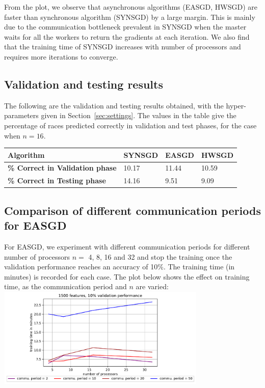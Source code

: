 \documentclass[12pt]{article}
\begin{document}
From the plot, we observe that asynchronous algorithms (EASGD, HWSGD) are faster than synchronous algorithm (SYNSGD) by a large margin. This is mainly due to the communication bottleneck prevalent in SYNSGD when the master waits for all the workers to return the gradients at each iteration. We also find that the training time of SYNSGD increases with number of processors and requires more iterations to converge.

\subsection{Validation and testing results}
The following are the validation and testing results obtained, with the hyper-parameters given in Section~\ref{sec:settings}. The values in the table give the percentage of races predicted correctly in validation and test phases, for the case when $n=16$. 
\begin{table}[ht]
\centering
 \begin{tabular}{llll} 
 \toprule
\textbf{Algorithm} & SYNSGD & EASGD & HWSGD \\ \midrule
\textbf{\% Correct in Validation phase} & 10.17 & 11.44 & 10.59 \\
\textbf{\% Correct in Testing phase} & 14.16 & 9.51 & 9.09 \\
\bottomrule
\end{tabular}
\end{table}

\subsection{Comparison of different communication periods for EASGD}
For EASGD, we experiment with different communication periods for different number of processors $n=$ 4, 8, 16 and 32 and stop the training once the validation performance reaches an accuracy of 10\%. The  training  time (in  minutes)  is  recorded  for  each  case. The plot below shows the effect on training time, as the communication period and $n$ are varied:\\

{\centering
\includegraphics[width=10cm, height=4.8cm]{images/1500f_10v_ea.pdf}\\
}
\end{document}
